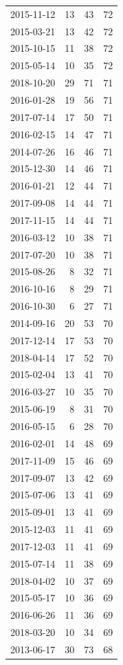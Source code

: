 \begin{tabular}{lrrr}
2015-11-12 & 13 & 43 & 72 \\
2015-03-21 & 13 & 42 & 72 \\
2015-10-15 & 11 & 38 & 72 \\
2015-05-14 & 10 & 35 & 72 \\
2018-10-20 & 29 & 71 & 71 \\
2016-01-28 & 19 & 56 & 71 \\
2017-07-14 & 17 & 50 & 71 \\
2016-02-15 & 14 & 47 & 71 \\
2014-07-26 & 16 & 46 & 71 \\
2015-12-30 & 14 & 46 & 71 \\
2016-01-21 & 12 & 44 & 71 \\
2017-09-08 & 14 & 44 & 71 \\
2017-11-15 & 14 & 44 & 71 \\
2016-03-12 & 10 & 38 & 71 \\
2017-07-20 & 10 & 38 & 71 \\
2015-08-26 & 8 & 32 & 71 \\
2016-10-16 & 8 & 29 & 71 \\
2016-10-30 & 6 & 27 & 71 \\
2014-09-16 & 20 & 53 & 70 \\
2017-12-14 & 17 & 53 & 70 \\
2018-04-14 & 17 & 52 & 70 \\
2015-02-04 & 13 & 41 & 70 \\
2016-03-27 & 10 & 35 & 70 \\
2015-06-19 & 8 & 31 & 70 \\
2016-05-15 & 6 & 28 & 70 \\
2016-02-01 & 14 & 48 & 69 \\
2017-11-09 & 15 & 46 & 69 \\
2017-09-07 & 13 & 42 & 69 \\
2015-07-06 & 13 & 41 & 69 \\
2015-09-01 & 13 & 41 & 69 \\
2015-12-03 & 11 & 41 & 69 \\
2017-12-03 & 11 & 41 & 69 \\
2015-07-14 & 11 & 38 & 69 \\
2018-04-02 & 10 & 37 & 69 \\
2015-05-17 & 10 & 36 & 69 \\
2016-06-26 & 11 & 36 & 69 \\
2018-03-20 & 10 & 34 & 69 \\
2013-06-17 & 30 & 73 & 68 \\

\end{tabular}

